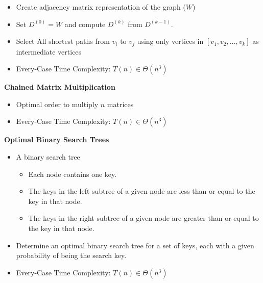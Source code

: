 \documentclass{../cheat}
\begin{document}
\begin{multicols}{3}
		
		\begin{itemize}
			\item Create adjacency matrix representation of the graph ($W$)
			\item Set $D^{(0)}=W$ and compute $D^{(k)}$ from $D^{(k-1)}$. 
			\item Select All shortest paths from $v_i$ to $v_j$ using only vertices in $[v_1, v_2, \ldots, v_k]$ as intermediate vertices
			\item Every-Case Time Complexity: $T(n) \in \Theta(n^3)$
		\end{itemize}
		
	\textbf{Chained Matrix Multiplication}
	\begin{itemize}
		\item Optimal order to multiply $n$ matrices
		\item Every-Case Time Complexity: $T(n) \in \Theta(n^3)$
	\end{itemize}

	
	\textbf{Optimal Binary Search Trees}
	\begin{itemize}
		\item A binary search tree
			\begin{itemize}
				\item Each node contains one key.
				\item The keys in the left subtree of a given node are less than or equal to the key in that node.
				\item The keys in the right subtree of a given node are greater than or equal to the key in that node.
			\end{itemize}
		\item Determine an optimal binary search tree for a set of keys, each with a given probability of being the search key. 
		\item Every-Case Time Complexity: $T(n) \in \Theta(n^3)$
	\end{itemize}
	
	


\end{multicols}
\end{document}
